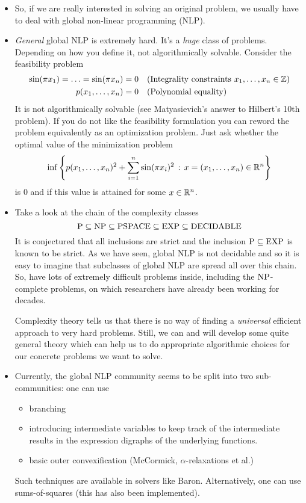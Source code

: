 \begin{itemize}
	\item So, if we are really interested in solving an original problem, we usually have to deal with global non-linear programming (NLP).
	\item \emph{General} global NLP is extremely hard. It's a \emph{huge} class of problems. Depending on how you define it, not algorithmically solvable. Consider the feasibility problem 
	\begin{align*}
		\sin(\pi x_1) = \ldots = \sin(\pi x_n) & = 0 & & \text{(Integrality constraints $x_1,\ldots,x_n \in \mathbb{Z}$)}
		\\ p(x_1,\ldots,x_n) & = 0 & & \text{(Polynomial equality)}
	\end{align*}
	It is not algorithmically solvable (see Matyasievich's answer to Hilbert's 10th problem). If you do not like the feasibility formulation you can reword the problem equivalently as an optimization problem. Just ask whether the optimal value of the minimization problem
	\[
		\inf \left\{ p(x_1,\ldots,x_n)^2 + \sum_{i=1}^n \sin(\pi x_i)^2 \,:\, x=(x_1,\ldots,x_n) \in \mathbb{R}^n \right\} 
	\]
	is $0$ and if this value is attained for some $x \in \mathbb{R}^n$.
	
	\item Take a look at the chain of the complexity classes
	\[
		\operatorname{P} \subseteq \operatorname{NP} \subseteq \operatorname{PSPACE} \subseteq \operatorname{EXP} \subseteq \operatorname{DECIDABLE}
	\]
	It is conjectured that all inclusions are strict and the inclusion $\operatorname{P} \subseteq \operatorname{EXP}$ is known to be strict. As we have seen, global NLP is not decidable and so it is easy to imagine that subclasses of global NLP are spread all over this chain. So, have lots of extremely difficult problems inside, including the $\operatorname{NP}$-complete problems, on which researchers have already been working for decades. 
	
	Complexity theory tells us that there is no way of finding a \emph{universal} efficient approach to very hard problems. Still, we can and will develop some quite general theory which can help us to do appropriate algorithmic choices for our concrete problems we want to solve. 
	\item Currently, the global NLP community seems to be split into two sub-communities: one can use
	\begin{itemize}
		\item branching
		\item introducing intermediate variables to keep track of the intermediate results in the expression digraphs of the underlying functions.
		\item basic outer convexification (McCormick, $\alpha$-relaxations  et al.)
	\end{itemize}
	Such techniques are available in solvers like Baron. 
	Alternatively, one can use sums-of-squares (this has also been implemented).
\end{itemize}
	
